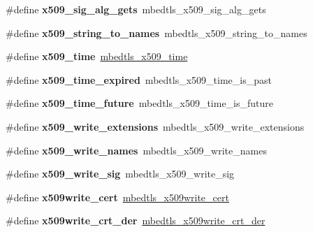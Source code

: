 \begin{DoxyCompactItemize}
\#define {\bfseries x509\+\_\+sig\+\_\+alg\+\_\+gets}~mbedtls\+\_\+x509\+\_\+sig\+\_\+alg\+\_\+gets
\item 
\mbox{\label{compat-1_83_8h_a235c3452a51701436f08286239f750b2}} 
\#define {\bfseries x509\+\_\+string\+\_\+to\+\_\+names}~mbedtls\+\_\+x509\+\_\+string\+\_\+to\+\_\+names
\item 
\mbox{\label{compat-1_83_8h_af848c676656aa4683a624c0e389c7c81}} 
\#define {\bfseries x509\+\_\+time}~\mbox{\hyperlink{structmbedtls__x509__time}{mbedtls\+\_\+x509\+\_\+time}}
\item 
\mbox{\label{compat-1_83_8h_a66e9d398304eed2b39020b960e119e4b}} 
\#define {\bfseries x509\+\_\+time\+\_\+expired}~mbedtls\+\_\+x509\+\_\+time\+\_\+is\+\_\+past
\item 
\mbox{\label{compat-1_83_8h_a1e8e0ccff9ef41cb2f1506aff9260f1a}} 
\#define {\bfseries x509\+\_\+time\+\_\+future}~mbedtls\+\_\+x509\+\_\+time\+\_\+is\+\_\+future
\item 
\mbox{\label{compat-1_83_8h_a964ff1bb3dd9cb7e7b30bac2a808bd5e}} 
\#define {\bfseries x509\+\_\+write\+\_\+extensions}~mbedtls\+\_\+x509\+\_\+write\+\_\+extensions
\item 
\mbox{\label{compat-1_83_8h_a6ceb46d3704d21e5ac77929f3f14e14f}} 
\#define {\bfseries x509\+\_\+write\+\_\+names}~mbedtls\+\_\+x509\+\_\+write\+\_\+names
\item 
\mbox{\label{compat-1_83_8h_a36975c1a6437e8288848fbaf7a6982fe}} 
\#define {\bfseries x509\+\_\+write\+\_\+sig}~mbedtls\+\_\+x509\+\_\+write\+\_\+sig
\item 
\mbox{\label{compat-1_83_8h_ae735b6a7be440ec5d6a036e17c432731}} 
\#define {\bfseries x509write\+\_\+cert}~\mbox{\hyperlink{structmbedtls__x509write__cert}{mbedtls\+\_\+x509write\+\_\+cert}}
\item 
\mbox{\label{compat-1_83_8h_a5786ed7019e7a893015264f6876377ef}} 
\#define {\bfseries x509write\+\_\+crt\+\_\+der}~\mbox{\hyperlink{x509__crt_8h_ada0550c8f7ce3e8b360f69c7475fa32f}{mbedtls\+\_\+x509write\+\_\+crt\+\_\+der}}

\end{DoxyCompactItemize}
